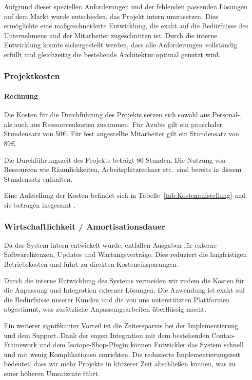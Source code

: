 Aufgrund dieser speziellen Anforderungen und der fehlenden passenden Lösungen auf dem Markt wurde entschieden, das Projekt intern umzusetzen. Dies ermöglichte eine maßgeschneiderte Entwicklung, die exakt auf die Bedürfnisse des Unternehmens und der Mitarbeiter zugeschnitten ist. Durch die interne Entwicklung konnte sichergestellt werden, dass alle Anforderungen vollständig erfüllt und gleichzeitig die bestehende Architektur optimal genutzt wird.

\subsubsection{Projektkosten}
\label{sec:Projektkosten}

\paragraph{Rechnung}
Die Kosten für die Durchführung des Projekts setzen sich sowohl aus Personal-, als auch aus Ressourcenkosten zusammen. Für Azubis gilt ein pauschaler Stundensatz von 50€. Für fest angestellte Mitarbeiter gilt ein Stundensatz von 89€.

Die Durchführungszeit des Projekts beträgt 80 Stunden. Die Nutzung von Ressourcen wie Räumlichkeiten, Arbeitsplatzrechner etc.\ sind bereits in diesem Stundensatz enthalten.

Eine Aufstellung der Kosten befindet sich in Tabelle~\ref{tab:Kostenaufstellung} und sie betragen insgesamt .


\subsubsection{Wirtschaftlichkeit / Amortisationsdauer}
\label{sec:Amortisationsdauer}

Da das System intern entwickelt wurde, entfallen Ausgaben für externe Softwarelizenzen, Updates und Wartungsverträge. Dies reduziert die langfristigen Betriebskosten und führt zu direkten Kosteneinsparungen.

Durch die interne Entwicklung des Systems vermeiden wir zudem die Kosten für die Anpassung und Integration externer Lösungen. Die Anwendung ist exakt auf die Bedürfnisse unserer Kunden und die von uns unterstützten Plattformen abgestimmt, was zusätzliche Anpassungsarbeiten überflüssig macht.

Ein weiterer signifikanter Vorteil ist die Zeitersparnis bei der Implementierung und dem Support. Dank der engen Integration mit dem bestehenden Contao-Framework und dem Isotope-Shop-Plugin können Entwickler das System schnell und mit wenig Komplikationen einrichten. Die reduzierte Implementierungszeit bedeutet, dass wir mehr Projekte in kürzerer Zeit abschließen können, was zu einer höheren Umsatzrate führt.

